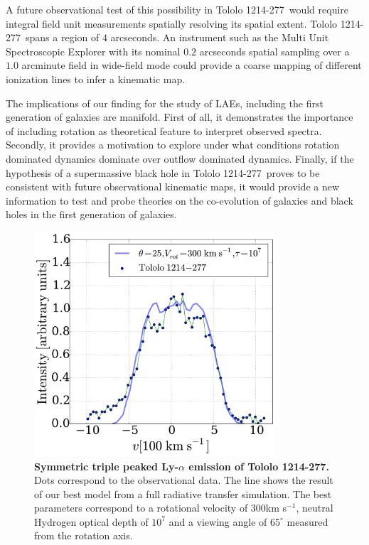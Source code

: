 \documentclass[a4paper, usenatbib, 12pt]{article}
\newcommand{\tol}{Tololo 1214-277}
\begin{document}
{A future observational test of this possibility in \tol\ would require
integral field unit measurements spatially resolving its spatial
extent. 
\tol\ spans a region of $4$ arcseconds. 
An instrument such as the Multi Unit Spectroscopic Explorer with its
nominal $0.2$ arcseconds spatial sampling over a $1.0$ arcminute field
in wide-field mode could provide a coarse mapping of different
ionization lines to infer a kinematic map.


The implications of our finding for the study of LAEs, including the
first generation of galaxies are manifold. 
First of all, it demonstrates the importance of including rotation as
theoretical feature to interpret observed spectra. 
Secondly, it provides a motivation to explore under what conditions
rotation dominated dynamics dominate over outflow
dominated dynamics. 
Finally, if the hypothesis of a supermassive black
hole in \tol\ proves to be consistent with future observational
kinematic maps, it would provide a new information to test and probe
theories on the co-evolution of galaxies and black holes in the first
generation of galaxies. 


\begin{figure}
\begin{center}
\includegraphics[width=0.8\textwidth]{tolfit.pdf}
\caption{{\bf Symmetric triple peaked Ly-$\alpha$ emission of \tol.}
  Dots correspond to the observational data. The line shows the result
of our best model from a full radiative transfer simulation. The best
parameters correspond to a rotational velocity of $300$km s$^{-1}$,
neutral Hydrogen optical depth of $10^{7}$ and a viewing angle of
$65^{\circ}$ measured from the rotation axis.} 
\end{center}
\end{figure}

}
\end{document}
